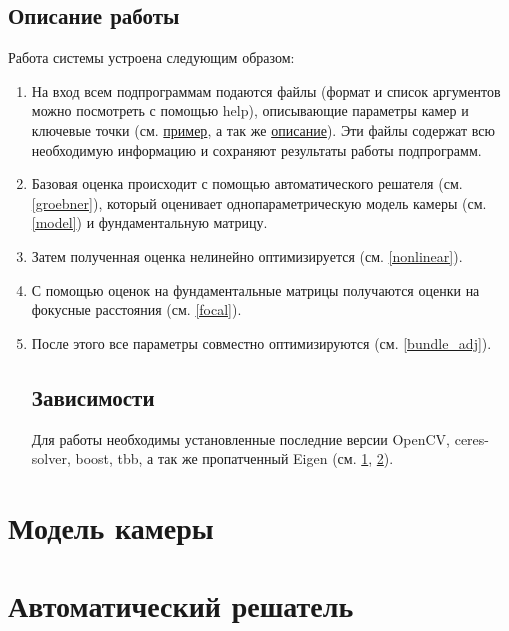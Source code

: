 \section{Описание работы}
Работа системы устроена следующим образом:
\begin{enumerate}
	\item На вход всем подпрограммам подаются файлы (формат и список аргументов можно посмотреть с помощью help), описывающие параметры камер и ключевые точки (см. \href{https://github.com/QuantumMechanicus/camera_calibration/blob/dev/pipeline/bin/A_data/552.data}{пример}, а так же \href{https://github.com/QuantumMechanicus/camera_calibration/blob/dev/README.md}{описание}). Эти файлы содержат всю необходимую информацию и сохраняют результаты работы подпрограмм.
	\item Базовая оценка происходит с помощью автоматического решателя (см. \ref{groebner}), который оценивает однопараметрическую модель камеры (см. \ref{model}) и фундаментальную матрицу.
	\item Затем полученная оценка нелинейно оптимизируется (см. \ref{nonlinear}).
	\item С помощью оценок на фундаментальные матрицы получаются оценки на фокусные расстояния (см. \ref{focal}).
	\item После этого все параметры совместно оптимизируются (см. \ref{bundle_adj}).

\section{Зависимости}
Для работы необходимы установленные последние версии OpenCV, ceres-solver, boost, tbb, а так же пропатченный Eigen (см. \href{https://bitbucket.org/dkorchemkin/eigen/commits/6e3f920c0f5e3e64f3952d6b8589ee74e38f8bef}{1}, \href{https://bitbucket.org/dkorchemkin/eigen/commits/27696f4148ffc4aadaa7871d1900aaac4db51937}{2}).  

	

\end{enumerate}
	
\chapter{Модель камеры}


\chapter{Автоматический решатель}


